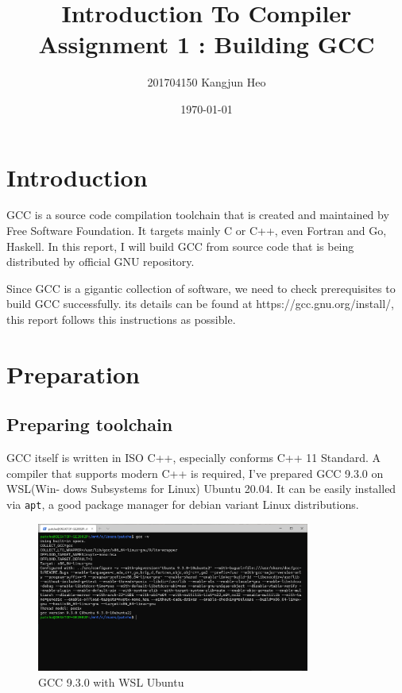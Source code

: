 \documentclass{article}
\title{Introduction To Compiler Assignment 1 : Building GCC}
\author{201704150 Kangjun Heo}
\date{\today}
\begin{document}
\maketitle

\section{Introduction}
GCC is a source code compilation toolchain that is created and maintained by Free Software Foundation. 
It targets mainly C or C++, even Fortran and Go, Haskell. In this report, I will build GCC from source code
that is being distributed by official GNU repository.

Since GCC is a gigantic collection of software, we need to check prerequisites to build GCC successfully.
its details can be found at https://gcc.gnu.org/install/, this report follows this instructions as possible. 

\section{Preparation}

\subsection{Preparing toolchain}

\par GCC itself is written in ISO C++, especially conforms C++ 11 Standard. A compiler that supports modern C++
is required, I've prepared GCC 9.3.0 on WSL(Win- dows Subsystems for Linux) Ubuntu 20.04. It can be easily 
installed via \texttt{apt}, a good package manager for debian variant Linux distributions. \\

\begin{figure}[!htbp]
    \centering
    \includegraphics[width=0.8\textwidth]{images/1.png}
    \caption{GCC 9.3.0 with WSL Ubuntu}
\end{figure}
\end{document}
